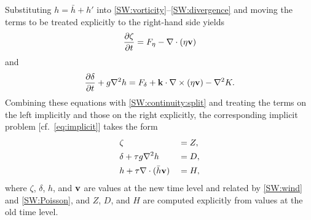 \documentclass[12pt]{article}
\newcommand{\href}{\bar{h}}
\newcommand{\cross}{\times}
\newcommand{\del}{\nabla}
\begin{document}
Substituting $h=\href+h'$ into \eqref{SW:vorticity}--\eqref{SW:divergence} and
moving the terms to be treated explicitly to the right-hand side yields
\begin{equation}
   \frac{\partial \zeta}{\partial t} = \Feta - \del\cdot(\eta\vecv)
\label{SW:vorticity:split}
\end{equation}
and
\begin{equation}
   \frac{\partial \delta}{\partial t} + g\del^2 h = 
      \Fdelta + \veck\cdot\del\cross(\eta\vecv) - \del^2 K.
\label{SW:divergence:split}
\end{equation}
Combining these equations with \eqref{SW:continuity:split} and treating the
terms on the left implicitly and those on the right explicitly, the
corresponding implicit problem [cf.~\eqref{eq:implicit}] takes the form
\begin{alignat}{2}
   &\zeta &&= Z,
\label{VD:vorticity:imp}
\\
   &\delta  + \tau g\del^2 h &&= D,
\label{VD:divergence:imp}
\\
  &h + \tau \del\cdot(\href\vecv) &&= H ,
\label{VD:continuity:imp}
\end{alignat}
where $\zeta$, $\delta$, $h$, and $\mathbf{v}$ are values at the new time level and
related by \eqref{SW:wind} and \eqref{SW:Poisson}, and $Z$, $D$, and $H$ are
computed explicitly from values at the old time level.  

\newcommand{\chihat}{\hat\chi}
\end{document}
